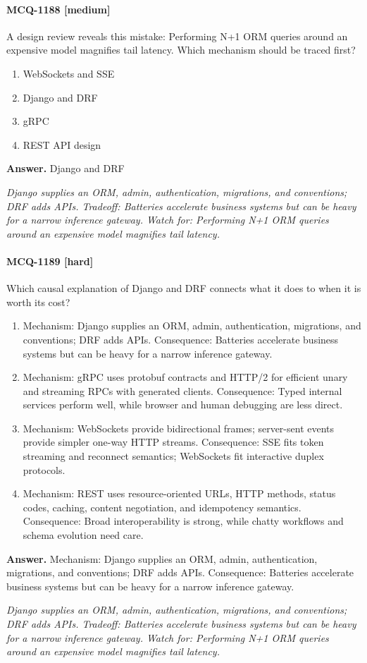\paragraph{MCQ-1188 [medium]} A design review reveals this mistake: Performing N+1 ORM queries around an expensive model magnifies tail latency. Which mechanism should be traced first?
\begin{enumerate}[label=\Alph*.]
\item WebSockets and SSE
\item Django and DRF
\item gRPC
\item REST API design
\end{enumerate}
\noindent\textbf{Answer.} Django and DRF
\par\textit{Django supplies an ORM, admin, authentication, migrations, and conventions; DRF adds APIs. Tradeoff: Batteries accelerate business systems but can be heavy for a narrow inference gateway. Watch for: Performing N+1 ORM queries around an expensive model magnifies tail latency.}
\paragraph{MCQ-1189 [hard]} Which causal explanation of Django and DRF connects what it does to when it is worth its cost?
\begin{enumerate}[label=\Alph*.]
\item Mechanism: Django supplies an ORM, admin, authentication, migrations, and conventions; DRF adds APIs. Consequence: Batteries accelerate business systems but can be heavy for a narrow inference gateway.
\item Mechanism: gRPC uses protobuf contracts and HTTP/2 for efficient unary and streaming RPCs with generated clients. Consequence: Typed internal services perform well, while browser and human debugging are less direct.
\item Mechanism: WebSockets provide bidirectional frames; server-sent events provide simpler one-way HTTP streams. Consequence: SSE fits token streaming and reconnect semantics; WebSockets fit interactive duplex protocols.
\item Mechanism: REST uses resource-oriented URLs, HTTP methods, status codes, caching, content negotiation, and idempotency semantics. Consequence: Broad interoperability is strong, while chatty workflows and schema evolution need care.
\end{enumerate}
\noindent\textbf{Answer.} Mechanism: Django supplies an ORM, admin, authentication, migrations, and conventions; DRF adds APIs. Consequence: Batteries accelerate business systems but can be heavy for a narrow inference gateway.
\par\textit{Django supplies an ORM, admin, authentication, migrations, and conventions; DRF adds APIs. Tradeoff: Batteries accelerate business systems but can be heavy for a narrow inference gateway. Watch for: Performing N+1 ORM queries around an expensive model magnifies tail latency.}
